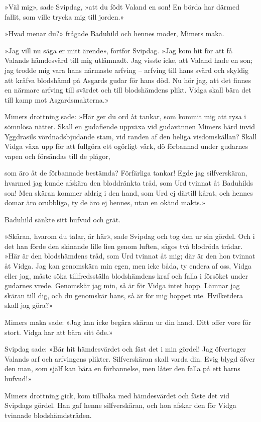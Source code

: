 »Väl mig», sade Svipdag, »att du födt Valand en son! En börda har därmed
fallit, som ville trycka mig till jorden.»

»Hvad menar du?» frågade Baduhild och hennes moder, Mimers maka.

»Jag vill nu säga er mitt ärende», fortfor Svipdag. »Jag kom hit för att
få Valands hämdesvärd till mig utlämnadt. Jag visste icke, att Valand
hade en son; jag trodde mig vara hans närmaste arfving -- arfving till
hans svärd och skyldig att kräfva blodshämd på Asgards gudar för hans
död. Nu hör jag, att det finnes en närmare arfving till svärdet och till
blodshämdens plikt. Vidga skall bära det till kamp mot Asgardsmakterna.»

Mimers drottning sade: »Här ger du ord åt tankar, som kommit mig att
rysa i sömnlösa nätter. Skall en gudafiende uppväxa vid gudavännen
Mimers härd invid Yggdrasils vördnadsbjudande stam, vid randen af den
heliga visdomskällan? Skall Vidga växa upp för att fullgöra ett ogörligt
värk, dö förbannad under gudarnes vapen och försändas till de plågor,

som äro åt de förbannade bestämda? Förfärliga tankar! Egde jag
silfverskäran, hvarmed jag kunde afskära den bloddränkta tråd, som Urd
tvinnat åt Baduhilds son! Men skäran kommer aldrig i den hand, som Urd
ej därtill kårat, och hennes domar äro orubbliga, ty de äro ej hennes,
utan en okänd makts.»

Baduhild sänkte sitt hufvud och grät.

»Skäran, hvarom du talar, är här», sade Svipdag och tog den ur sin
gördel. Och i det han förde den skinande lille lien genom luften, sågos
två blodröda trådar. »Här är den blodshämdens tråd, som Urd tvinnat åt
mig; där är den hon tvinnat åt Vidga. Jag kan genomskära min egen, men
icke båda, ty endera af oss, Vidga eller jag, måste söka tillfredsställa
blodshämdens kraf och falla i försöket under gudarnes vrede. Genomskär
jag min, så är för Vidga intet hopp. Lämnar jag skäran till dig, och du
genomskär hans, så är för mig hoppet ute. Hvilketdera skall jag göra?»

Mimers maka sade: »Jag kan icke begära skäran ur din hand. Ditt offer
vore för stort. Vidga har att bära sitt öde.»

Svipdag sade: »Bär hit hämdesvärdet och fäst det i min gördel! Jag
öfvertager Valands arf och arfvingens plikter. Silfverskäran skall varda
din. Evig blygd öfver den man, som själf kan bära en förbannelse, men
låter den falla på ett barns hufvud!»

Mimers drottning gick, kom tillbaka med hämdesvärdet och fäste det vid
Svipdags gördel. Han gaf henne silfverskäran, och hon afskar den för
Vidga tvinnade blodshämdstråden.

